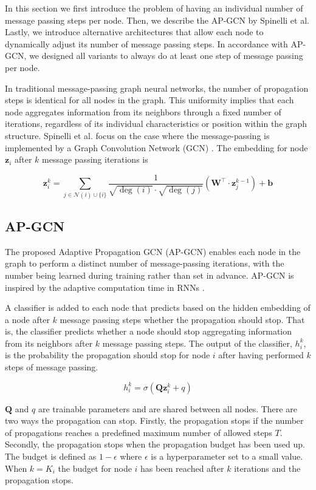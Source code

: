 \documentclass{gdl}
\begin{document}
In this section we first introduce the problem of having an individual number of message passing steps per node. Then, we describe the AP-GCN by Spinelli et al. Lastly, we introduce alternative architectures that allow each node to dynamically adjust its number of message passing steps. In accordance with AP-GCN, we designed all variants to always do at least one step of message passing per node.

In traditional message-passing graph neural networks, the number of propagation steps is identical for all nodes in the graph. This uniformity implies that each node aggregates information from its neighbors through a fixed number of iterations, regardless of its individual characteristics or position within the graph structure. Spinelli et al. focus on the case where the message-passing is implemented by a Graph Convolution Network (GCN) \cite{kipf2017}. The embedding for node $\mathbf{z}_i$ after $k$ message passing iterations is

$$
\mathbf{z}_i^{k} = \sum_{j \in \mathcal{N}(i) \cup \{i\}} \frac{1}{\sqrt{\deg(i)} \cdot \sqrt{\deg(j)}} \left( \mathbf{W}^\top \cdot \mathbf{z}_j^{k-1} \right) + \mathbf{b}
$$

\subsection{AP-GCN}
The proposed Adaptive Propagation GCN (AP-GCN) enables each node in the graph to perform a distinct number of message-passing iterations, with the number being learned during training rather than set in advance. AP-GCN is inspired by the adaptive computation time in RNNs \cite{graves2017}.

A classifier is added to each node that predicts based on the hidden embedding of a node after $k$ message passing steps whether the propagation should stop. That is, the classifier predicts whether a node should stop aggregating information from its neighbors after $k$ message passing steps. The output of the classifier, $h^k_i$, is the probability the propagation should stop for node $i$ after having performed $k$ steps of message passing.

$$h^k_i = \sigma(\textbf{Q}\textbf{z}^k_i + q)$$

\noindent $\textbf{Q}$ and $q$ are trainable parameters and are shared between all nodes. There are two ways the propagation can stop. Firstly, the propagation stops if the number of propagations reaches a predefined maximum number of allowed steps $T$. Secondly, the propagation stops when the propagation budget has been used up. The budget is defined as $1-\epsilon$ where $\epsilon$ is a hyperparameter set to a small value. When $k=K_i$ the budget for node $i$ has been reached after $k$ iterations and the propagation stops. 
\end{document}
